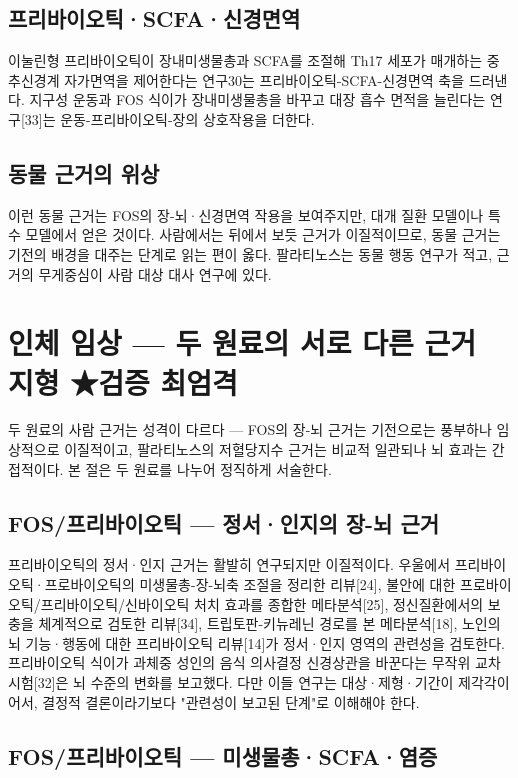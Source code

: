 \documentclass[12pt,oneside]{book}
\begin{document}
\subsection{프리바이오틱·SCFA·신경면역}

이눌린형 프리바이오틱이 장내미생물총과 SCFA를 조절해 Th17 세포가 매개하는 중추신경계 자가면역을 제어한다는 연구30는 프리바이오틱-SCFA-신경면역 축을 드러낸다. 지구성 운동과 FOS 식이가 장내미생물총을 바꾸고 대장 흡수 면적을 늘린다는 연구[33]는 운동-프리바이오틱-장의 상호작용을 더한다.

\subsection{동물 근거의 위상}

이런 동물 근거는 FOS의 장-뇌·신경면역 작용을 보여주지만, 대개 질환 모델이나 특수 모델에서 얻은 것이다. 사람에서는 뒤에서 보듯 근거가 이질적이므로, 동물 근거는 기전의 배경을 대주는 단계로 읽는 편이 옳다. 팔라티노스는 동물 행동 연구가 적고, 근거의 무게중심이 사람 대상 대사 연구에 있다.

\section{인체 임상 — 두 원료의 서로 다른 근거 지형 ★검증 최엄격}

두 원료의 사람 근거는 성격이 다르다 — FOS의 장-뇌 근거는 기전으로는 풍부하나 임상적으로 이질적이고, 팔라티노스의 저혈당지수 근거는 비교적 일관되나 뇌 효과는 간접적이다. 본 절은 두 원료를 나누어 정직하게 서술한다.

\subsection{FOS/프리바이오틱 — 정서·인지의 장-뇌 근거}

프리바이오틱의 정서·인지 근거는 활발히 연구되지만 이질적이다. 우울에서 프리바이오틱·프로바이오틱의 미생물총-장-뇌축 조절을 정리한 리뷰[24], 불안에 대한 프로바이오틱/프리바이오틱/신바이오틱 처치 효과를 종합한 메타분석[25], 정신질환에서의 보충을 체계적으로 검토한 리뷰[34], 트립토판-키뉴레닌 경로를 본 메타분석[18], 노인의 뇌 기능·행동에 대한 프리바이오틱 리뷰[14]가 정서·인지 영역의 관련성을 검토한다. 프리바이오틱 식이가 과체중 성인의 음식 의사결정 신경상관을 바꾼다는 무작위 교차시험[32]은 뇌 수준의 변화를 보고했다. 다만 이들 연구는 대상·제형·기간이 제각각이어서, 결정적 결론이라기보다 "관련성이 보고된 단계"로 이해해야 한다.

\subsection{FOS/프리바이오틱 — 미생물총·SCFA·염증}
\end{document}
